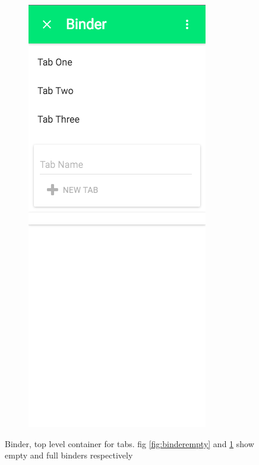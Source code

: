 \begin{figure}
\begin{subfigure}{.5\textwidth}
  \centering
  \includegraphics[width=.8\linewidth]{Figures/BinderFull.png}
  \caption{}
  \label{fig:binderfull}
\end{subfigure}
\caption{Binder, top level container for tabs. fig \ref{fig:binderempty} and \ref{fig:binderfull} show empty and full binders respectively}
\label{fig:binder}
\end{figure}

